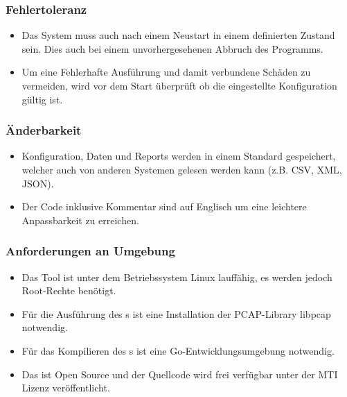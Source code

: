 \subsubsection{Fehlertoleranz}
\begin{itemize}
\item Das System muss auch nach einem Neustart in einem definierten Zustand sein. Dies auch bei einem unvorhergesehenen Abbruch des Programms. 
\item Um eine Fehlerhafte Ausführung und damit verbundene Schäden zu vermeiden, wird vor dem Start überprüft ob die eingestellte Konfiguration gültig ist.
\end{itemize}

\subsubsection{Änderbarkeit}
\begin{itemize}
\item Konfiguration, Daten und Reports werden in einem Standard gespeichert, welcher auch von anderen Systemen gelesen werden kann (z.B. CSV, XML, JSON).
\item Der Code inklusive Kommentar sind auf Englisch um eine leichtere Anpassbarkeit zu erreichen.
\end{itemize}

\subsubsection{Anforderungen an Umgebung}
\begin{itemize}
\item Das Tool ist unter dem Betriebssystem Linux lauffähig, es werden jedoch Root-Rechte benötigt.
\item Für die Ausführung des \tool{}s ist eine Installation der \ac{PCAP}-Library libpcap notwendig.
\item Für das Kompilieren des \tool{}s ist eine Go-Entwicklungsumgebung notwendig.
\item Das \tool{} ist Open Source und der Quellcode wird frei verfügbar unter der MTI Lizenz veröffentlicht.
\end{itemize}